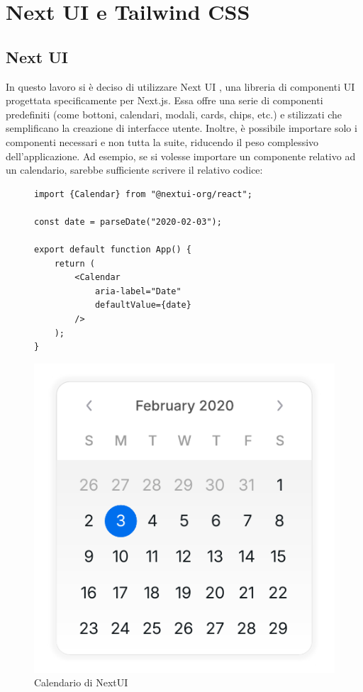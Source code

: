 \documentclass[target=bach,aauheader=,style=]{thud}
\begin{document}
\section{Next UI e Tailwind CSS}

\subsection{Next UI}
In questo lavoro si è deciso di utilizzare Next UI \cite{nextui2024}, una libreria di componenti UI progettata specificamente per Next.js. Essa offre una serie di componenti predefiniti (come bottoni, calendari, modali, cards, chips, etc.) e stilizzati che semplificano la creazione di interfacce utente. Inoltre, è possibile importare solo i componenti necessari e non tutta la suite, riducendo il peso complessivo dell'applicazione. Ad esempio, se si volesse importare un componente relativo ad un calendario, sarebbe sufficiente scrivere il relativo codice:

\begin{figure}[H]
    \centering
    \begin{minipage}{0.6\textwidth}
        \begin{lstlisting}[caption=Uso di un componente NextUI]
import {Calendar} from "@nextui-org/react";

const date = parseDate("2020-02-03");
    
export default function App() {
    return (
        <Calendar 
            aria-label="Date" 
            defaultValue={date} 
        /> 
    );
}
        \end{lstlisting}
    \end{minipage}%
    \hfill
    \begin{minipage}{0.35\textwidth}
        \centering
        \includegraphics[width=\textwidth]{img/calendar.pdf}
        \caption{Calendario di NextUI}
    \end{minipage}
\end{figure}
\end{document}
